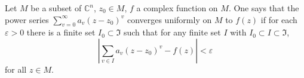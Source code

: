 Let $M$ be a subset of $\mathbb{C}^n$, $z_0 \in M$, $f$ a complex function on $M$. One says that the power series $\sum_{v=0}^{\infty} a_v(z - z_0)^v$ converges uniformly on $M$ to $f(z)$ if for each $\varepsilon > 0$ there is a finite set $I_0 \subset \Im$ such that for any finite set $I$ with $I_0 \subset I \subset \Im$,
$$\left| \sum_{v \in I} a_v(z - z_0)^v - f(z) \right| < \varepsilon$$
for all $z \in M$.
